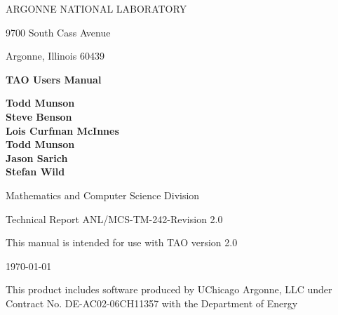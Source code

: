 
\vspace{1.75in}

\begin{center}

ARGONNE NATIONAL LABORATORY

9700 South Cass Avenue

Argonne, Illinois  60439

\vspace{1.5in}

{\Large
{\bf 
TAO Users Manual
}
}

\vspace{.5in}

{\bf Todd Munson \\ Steve Benson \\ Lois Curfman McInnes \\ Todd Munson \\ Jason Sarich \\ Stefan Wild}

\vspace{.5in}

Mathematics and Computer Science Division

\vspace{.25in}

Technical Report  ANL/MCS-TM-242-Revision 2.0

\vspace{.25in}

This manual is intended for use with TAO version 2.0

\vspace{1.0in}

\today
\end{center}

\vspace{0.75in}

\par\noindent
This product includes software produced by UChicago Argonne, LLC under 
Contract No. DE-AC02-06CH11357 with the Department of Energy
